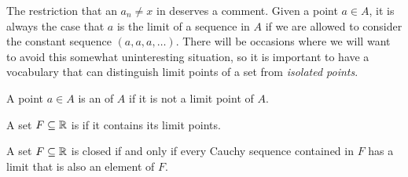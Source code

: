 \begin{remark}
  The restriction that an $a_n \neq x$ in
   deserves a comment. Given a
  point $a \in A$, it is always the case that $a$ is the limit of a
  sequence in $A$ if we are allowed to consider the constant sequence
  $(a, a, a, \dots)$. There will be occasions where we will want to
  avoid this somewhat uninteresting situation, so it is important to
  have a vocabulary that can distinguish limit points of a set from
  \textit{isolated points}.
\end{remark}

\begin{definition}
  A point $a \in A$ is an  of $A$ if it is not
  a limit point of $A$.
\end{definition}

\begin{definition}
  A set $F \subseteq \mathbb R$ is  if it contains its limit points.
\end{definition}

\begin{theorem}
  A set $F \subseteq \mathbb R$ is closed if and only if every Cauchy
  sequence contained in $F$ has a limit that is also an element of $F$.
\end{theorem}
